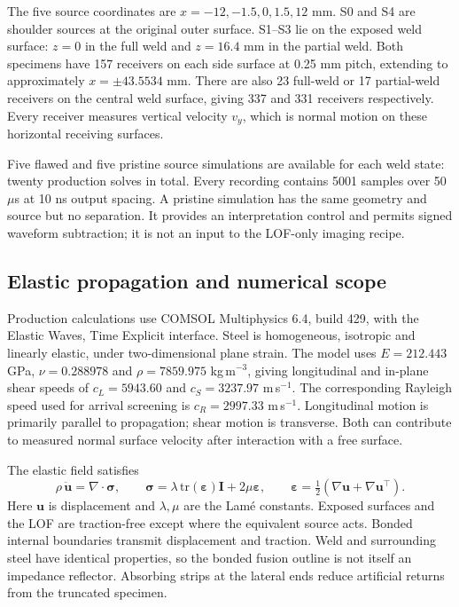 \documentclass[11pt]{article}
\begin{document}
The five source coordinates are $x=-12,-1.5,0,1.5,12$ mm. S0 and S4 are shoulder sources at the original outer surface. S1--S3 lie on the exposed weld surface: $z=0$ in the full weld and $z=16.4$ mm in the partial weld. Both specimens have 157 receivers on each side surface at 0.25 mm pitch, extending to approximately $x=\pm43.5534$ mm. There are also 23 full-weld or 17 partial-weld receivers on the central weld surface, giving 337 and 331 receivers respectively. Every receiver measures vertical velocity $v_y$, which is normal motion on these horizontal receiving surfaces.

Five flawed and five pristine source simulations are available for each weld state: twenty production solves in total. Every recording contains 5001 samples over 50 $\mu$s at 10 ns output spacing. A pristine simulation has the same geometry and source but no separation. It provides an interpretation control and permits signed waveform subtraction; it is not an input to the LOF-only imaging recipe.

\subsection{Elastic propagation and numerical scope}
Production calculations use COMSOL Multiphysics 6.4, build 429, with the Elastic Waves, Time Explicit interface. Steel is homogeneous, isotropic and linearly elastic, under two-dimensional plane strain. The model uses $E=212.443$ GPa, $\nu=0.288978$ and $\rho=7859.975$ kg\,m$^{-3}$, giving longitudinal and in-plane shear speeds of $c_L=5943.60$ and $c_S=3237.97$ m\,s$^{-1}$. The corresponding Rayleigh speed used for arrival screening is $c_R=2997.33$ m\,s$^{-1}$. Longitudinal motion is primarily parallel to propagation; shear motion is transverse. Both can contribute to measured normal surface velocity after interaction with a free surface.

The elastic field satisfies
\begin{equation}
 \rho\,\ddot{\mathbf u}=\nabla\!\cdot\boldsymbol\sigma,
 \qquad \boldsymbol\sigma=\lambda\,\mathrm{tr}(\boldsymbol\varepsilon)\mathbf I
                 +2\mu\boldsymbol\varepsilon,
 \qquad \boldsymbol\varepsilon=\tfrac12(\nabla\mathbf u+\nabla\mathbf u^{\top}).
\end{equation}
Here $\mathbf u$ is displacement and $\lambda,\mu$ are the Lam\'e constants. Exposed surfaces and the LOF are traction-free except where the equivalent source acts. Bonded internal boundaries transmit displacement and traction. Weld and surrounding steel have identical properties, so the bonded fusion outline is not itself an impedance reflector. Absorbing strips at the lateral ends reduce artificial returns from the truncated specimen.
\end{document}
